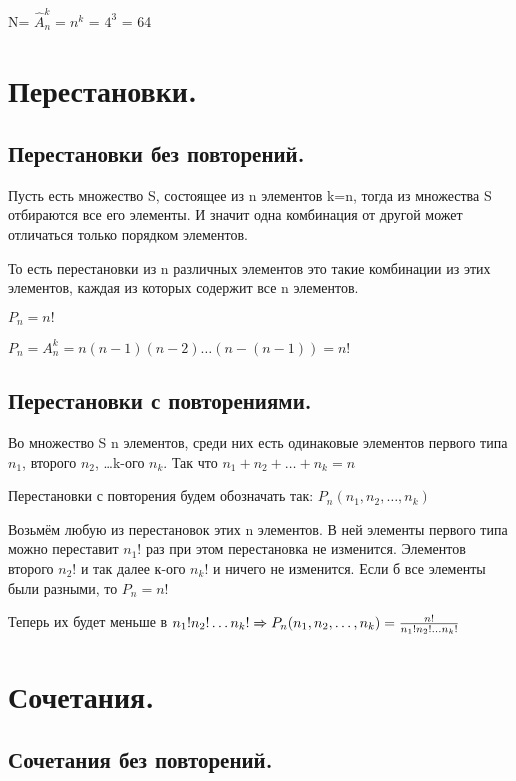 \documentclass[12pt, a4paper, oneside]{article}
\theoremstyle{plain} %
\theoremstyle{definition}
\begin{document}

N= $\hat{A}_n^k = n^k$ = $4^3$ = 64

\section{Перестановки.}



\subsection{Перестановки без повторений.}

Пусть есть множество S, состоящее из n элементов k=n, тогда из множества S отбираются все его элементы. И значит одна комбинация от другой  может отличаться только порядком элементов.

То есть перестановки из n различных элементов это такие комбинации из этих элементов, каждая из которых содержит все n элементов.

$P_n=n!$


$P_n = A_n^k = n(n-1)(n-2)\dots(n-(n-1)) = n!$

\subsection{Перестановки с повторениями.}

Во множество S n элементов, среди них есть одинаковые элементов первого типа $n_1$, второго $n_2$, \dots k-ого $n_k$. Так что $n_1+n_2+\dots +n_k=n$

Перестановки с повторения будем обозначать так: $P_n(n_1,n_2,\dots ,n_k)$

Возьмём любую из перестановок этих n элементов. В ней элементы первого типа можно переставит $n_1!$ раз при этом перестановка не изменится. Элементов второго $n_2!$ и так далее к-ого $n_k!$ и ничего не изменится. Если б все элементы были разными, то $P_n=n!$

Теперь их будет меньше в $n_1!n_2!\dots n_k! \xRightarrow[]{} P_n(n_1,n_2,\dots, n_k) =  \frac{n!}{n_1!n_2!\dots n_k!} $

\section{Сочетания.}

\subsection{Сочетания без повторений.}
\end{document}
